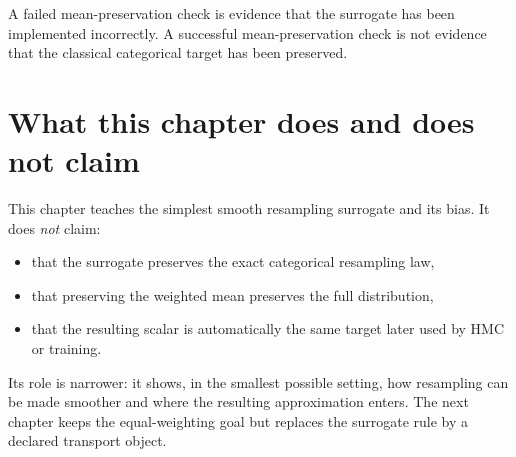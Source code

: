 A failed mean-preservation check is evidence that the surrogate has been
implemented incorrectly.  A successful mean-preservation check is not evidence
that the classical categorical target has been preserved.

\section{What this chapter does and does not claim}
\label{sec:bf-soft-boundary}

This chapter teaches the simplest smooth resampling surrogate and its bias.  It
does \emph{not} claim:
\begin{itemize}
  \item that the surrogate preserves the exact categorical resampling law,
  \item that preserving the weighted mean preserves the full distribution,
  \item that the resulting scalar is automatically the same target later used by
  HMC or training.
\end{itemize}
Its role is narrower: it shows, in the smallest possible setting, how
resampling can be made smoother and where the resulting approximation enters.
The next chapter keeps the equal-weighting goal but replaces the surrogate rule
by a declared transport object.

\FloatBarrier

